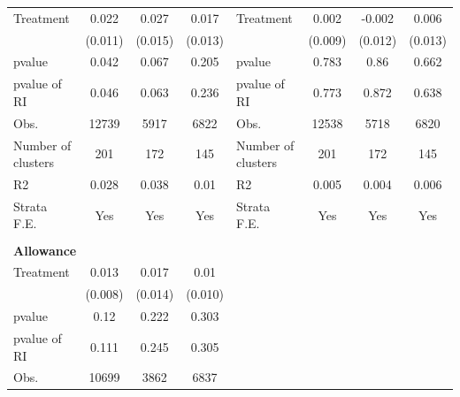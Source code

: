 \begin{table}[h!]
\begin{threeparttable}
\begin{tabular}{lccclccc}
 Treatment &    0.022 &     0.027 &      0.017 &  Treatment &      0.002 &     -0.002 &      0.006 \\

           &    (0.011) &    (0.015) &    (0.013) &            &    (0.009) &    (0.012) &    (0.013) \\

    pvalue &      0.042 &      0.067 &      0.205 &     pvalue &      0.783 &       0.86 &      0.662 \\

pvalue of RI &      0.046 &      0.063 &      0.236 & pvalue of RI &      0.773 &      0.872 &      0.638 \\

      Obs. &      12739 &       5917 &       6822 &       Obs. &      12538 &       5718 &       6820 \\

Number of clusters &        201 &        172 &        145 & Number of clusters &        201 &        172 &        145 \\

        R2 &      0.028 &      0.038 &       0.01 &         R2 &      0.005 &      0.004 &      0.006 \\

Strata F.E. &        Yes &        Yes &        Yes & Strata F.E. &        Yes &        Yes &        Yes \\

           &            &            &            &            &            &            &            \\
\hline
             \multicolumn{ 4}{l}{{\bf Allowance}} &     {\bf } &            &            &            \\

 Treatment &      0.013 &      0.017 &       0.01 &            &            &            &            \\

           &    (0.008) &    (0.014) &    (0.010) &            &            &            &            \\

    pvalue &       0.12 &      0.222 &      0.303 &            &            &            &            \\

pvalue of RI &      0.111 &      0.245 &      0.305 &            &            &            &            \\

      Obs. &      10699 &       3862 &       6837 &            &            &            &            \\


\end{tabular}
\end{threeparttable}
\end{table}
